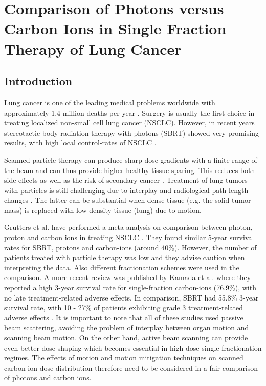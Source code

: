 \chapter{Comparison of Photons versus Carbon Ions in Single Fraction Therapy of Lung Cancer}
\label{PatStudy}


\section{Introduction}

Lung cancer is one of the leading medical problems worldwide with approximately 1.4 million deaths per year \cite{Siegel2014}. Surgery is usually the first choice in treating localized non-small cell lung cancer (NSCLC). However, in recent years stereotactic body-radiation therapy with photons (SBRT) showed very promising results, with high local control-rates of NSCLC \cite{Baumann2009, Fakiris2009, Grutters2010, Ricardi2010, Timmerman2010, Greco2011}.

Scanned particle therapy can produce sharp dose gradients with a finite range of the beam and can thus provide higher healthy tissue sparing. This reduces both side effects as well as the risk of secondary cancer \cite{Newhauser2011}. Treatment of lung tumors with particles is still challenging due to interplay and radiological path length changes \cite{Bert2011}.
The latter can be substantial when dense tissue (e.g. the solid tumor mass) is replaced with low-density tissue (lung) due to motion.

Grutters et al. have performed a meta-analysis on comparison between photon, proton and carbon ions in treating NSCLC \cite{Grutters2010}.
They found similar 5-year survival rates for SBRT, protons and carbon-ions (around 40\%). However, the number of patients treated with
particle therapy was low and they advise caution when interpreting the data. Also different fractionation schemes were used in the
comparison. A more recent review was published by  Kamada et al. \cite{Kamada2016} where they reported a high 3-year survival rate for
single-fraction carbon-ions (76.9\%), with no late treatment-related adverse effects. In comparison, SBRT had 55.8\% 3-year survival rate,
with 10 - 27\% of patients exhibiting grade 3 treatment-related adverse effects \cite{Timmerman2010}. It is important to note that all
of these studies used passive beam scattering, avoiding the problem of interplay between organ motion and scanning beam motion.
On the other hand, active beam scanning can provide even better dose shaping which becomes essential in high dose single fractionation
regimes. The effects of motion and motion mitigation techniques on scanned carbon ion dose distribution therefore need to be considered 
in a fair comparison of photons and carbon ions. 


